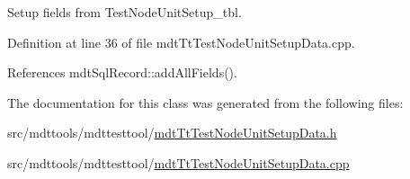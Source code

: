 Setup fields from Test\-Node\-Unit\-Setup\-\_\-tbl. 



Definition at line 36 of file mdt\-Tt\-Test\-Node\-Unit\-Setup\-Data.\-cpp.



References mdt\-Sql\-Record\-::add\-All\-Fields().



The documentation for this class was generated from the following files\-:\begin{DoxyCompactItemize}
\item 
src/mdttools/mdttesttool/\hyperlink{mdt_tt_test_node_unit_setup_data_8h}{mdt\-Tt\-Test\-Node\-Unit\-Setup\-Data.\-h}\item 
src/mdttools/mdttesttool/\hyperlink{mdt_tt_test_node_unit_setup_data_8cpp}{mdt\-Tt\-Test\-Node\-Unit\-Setup\-Data.\-cpp}\end{DoxyCompactItemize}
